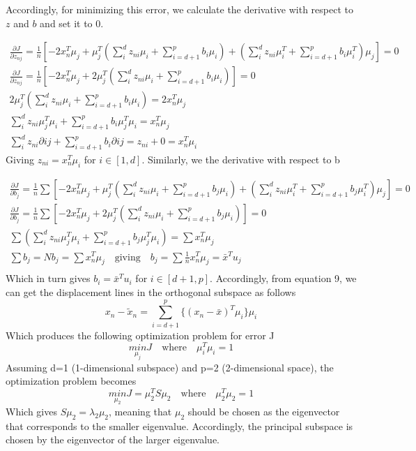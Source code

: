 \documentclass[12pt,a4paper]{article}
\begin{document}
	\noindent Accordingly, for minimizing this error, we calculate the derivative with respect to $z$ and $b$ and set it to 0.
	
	\vspace{-0.3cm}
	\begin{align*}
		\frac{\partial J}{\partial z_{nj}} = \frac{1}{n}[ -2x_n^T\mu_j+\mu_j^T(\sum_{i}^{d}z_{ni}\mu_i + \sum_{i=d+1}^{p}b_i\mu_i) + (\sum_{i}^{d}z_{ni}\mu_i^T + \sum_{i=d+1}^{p}b_i\mu_i^T)\mu_j] = 0 \\ 
		\frac{\partial J}{\partial z_{nj}} = \frac{1}{n}[ -2x_n^T\mu_j + 2 \mu_j^T(\sum_{i}^{d}z_{ni}\mu_i + \sum_{i=d+1}^{p}b_i\mu_i)] = 0 \qquad \qquad \\ 
		2 \mu_j^T(\sum_{i}^{d}z_{ni}\mu_i + \sum_{i=d+1}^{p}b_i\mu_i)= 2x_n^T\mu_j \qquad \qquad\qquad \quad\\
		\sum_{i}^{d}z_{ni}\mu_j^T\mu_i + \sum_{i=d+1}^{p}b_i\mu_j^T\mu_i=  x_n^T\mu_j \qquad \qquad\qquad \quad \\
		\sum_{i}^{d}z_{ni}\partial ij + \sum_{i=d+1}^{p}b_i\partial ij = z_{ni}+0 = x_n^T\mu_i \qquad \qquad\qquad \quad
	\end{align*}
	Giving $z_{ni}= x_n^T\mu_i$ for $i\in [1,d]$. Similarly, we the derivative with respect to b

	\vspace{-0.3cm}
	\begin{align*}
		\frac{\partial J}{\partial b_{j}} = \frac{1}{n}\sum[ -2x_n^T\mu_j+\mu_j^T(\sum_{i}^{d}z_{ni}\mu_i + \sum_{i=d+1}^{p}b_j\mu_i) + (\sum_{i}^{d}z_{ni}\mu_i^T + \sum_{i=d+1}^{p}b_j\mu_i^T)\mu_j] = 0 \\ 
		\frac{\partial J}{\partial b_{j}} = \frac{1}{n}\sum[ -2x_n^T\mu_j + 2 \mu_j^T(\sum_{i}^{d}z_{ni}\mu_i + \sum_{i=d+1}^{p}b_j\mu_i)] = 0 \qquad \qquad \\ 
		\sum(\sum_{i}^{d}z_{ni}\mu_j^T\mu_i + \sum_{i=d+1}^{p}b_j\mu_j^T\mu_i)=  \sum x_n^T\mu_j \qquad \qquad\qquad \quad \\
		\sum b_j= Nb_j =\sum x_n^T\mu_j \quad \text{giving}\quad b_j = \sum \frac{1}{n}x_n^T\mu_j = \bar{x}^Tu_j\qquad\qquad\\
	\end{align*}
	Which in turn gives $b_i=\bar{x}^Tu_i$ for $i\in [d+1,p]$. Accordingly, from equation 9, we can get the displacement lines in the orthogonal subspace as follows
	\begin{equation}
		x_n - \widetilde{x}_n = \sum_{i=d+1}^{p}\{(x_n-\bar{x})^T\mu_i\}\mu_i
	\end{equation}
	Which produces the following optimization problem for error J
	\begin{equation}
		\underset{\mu_j}{min} J \quad \text{where} \quad \mu_i^T\mu_i=1
	\end{equation}
	Assuming d=1 (1-dimensional subspace) and p=2 (2-dimensional space), the optimization problem becomes
	\begin{equation}
		\underset{\mu_2}{min} J = \mu_2^TS\mu_2 \quad \text{where} \quad \mu_2^T\mu_2=1
	\end{equation}
	Which gives $S\mu_2 = \lambda_2 \mu_2$, meaning that $\mu_2$ should be chosen as the eigenvector that corresponds to the smaller eigenvalue. Accordingly, the principal subspace is chosen by the eigenvector of the larger eigenvalue.
	
\end{document}

